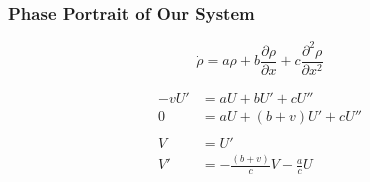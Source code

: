 \documentclass[a4paper]{article}
\begin{document}
\subsubsection*{Phase Portrait of Our System}

\begin{equation}
\dot{\rho} = a \rho + b \frac{\partial \rho}{\partial x} + c \frac{\partial ^2 \rho}{\partial x ^2}
\end{equation}

\begin{align*}
- v U' & = a U + b U ' + c U '' \\
0 & = a U + (b+v) U' +c U '' \\
\\
V & = U' \\
V ' & = - \frac{(b+v)}{c} V - \frac{a}{c} U 
\end{align*}
\end{document}

